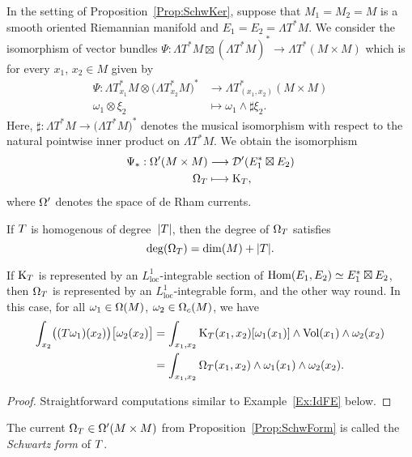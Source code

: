 \documentclass[\MainFolder/Text.tex]{subfiles}
\newcommand{\TestF}{\mathcal{D}}
\begin{document}
\begin{Proposition}\label{Prop:SchwForm}
In the setting of Proposition~\ref{Prop:SchwKer}, suppose that $M_1 = M_2 = M$ is a smooth oriented Riemannian manifold and $E_1 = E_2 = \Lambda T^* M$. We consider the isomorphism of vector bundles $\Psi:\Lambda T^*M\boxtimes(\Lambda T^*M)^*\rightarrow\Lambda T^*(M\times M)$ which is for every $x_1$, $x_2\in M$ given by
\begin{align*}
 \Psi: \Lambda T^*_{x_1}M\otimes\bigl(\Lambda T_{x_2}^*M\bigr)^* &\longrightarrow \Lambda T^*_{(x_1,x_2)}(M\times M) \\
 \omega_1\otimes\xi_2&\longmapsto\omega_1\wedge\sharp\xi_2.
\end{align*}
Here, $\sharp: \Lambda T^*M \rightarrow \bigl(\Lambda T^*M \bigr)^* $ denotes the musical isomorphism with respect to the natural pointwise inner product on $\Lambda T^*M$. We obtain the isomorphism
\begin{align*}
\Psi_*:\DR'(M\times M)&\longrightarrow\TestF'(E_1^*\boxtimes E_2)\\
\DR_\TOp&\longmapsto\KKer_\TOp,
\end{align*}
where $\Omega'$ denotes the space of de Rham currents.

If $T$ is homogenous of degree~$|T|$, then the degree of $\Omega_T$ satisfies 
$$ \operatorname{deg}(\Omega_T) = \dim(M) + |T|. $$

If $\mathrm{K}_T$ is represented by an $L^1_{\mathrm{loc}}$-integrable section of $\mathrm{Hom}(E_1,E_2)\simeq E_1^*\boxtimes E_2$, then $\Omega_T$ is represented by an $L^1_{\mathrm{loc}}$-integrable form, and the other way round. In this case, for all $\omega_1 \in \Omega(M)$, $\omega_2\in \Omega_c(M)$, we have
\begin{equation}\label{Eq:SchwarzKerForm}
\begin{aligned}
\int_{x_2} \bigl((T \omega_1)(x_2)\bigr)\bigl[\omega_2(x_2)\bigr] &= \int_{x_1, x_2} \mathrm{K}_T(x_1,x_2)[\omega_1(x_1)]\wedge \mathrm{Vol}(x_1)\wedge \omega_2(x_2)\\
&= \int_{x_1, x_2} \Omega_T(x_1,x_2)\wedge\omega_1(x_1)\wedge\omega_2(x_2).
\end{aligned}
\end{equation}
\end{Proposition}
\begin{proof}
Straightforward computations similar to Example~\ref{Ex:IdFE} below.
\end{proof}

\begin{Definition}\label{Def:SDFDF}
The current $\Omega_T\in \Omega'(M\times M)$ from Proposition~\ref{Prop:SchwForm} is called the \emph{Schwartz form} of $T$.
\end{Definition}
\end{document}
